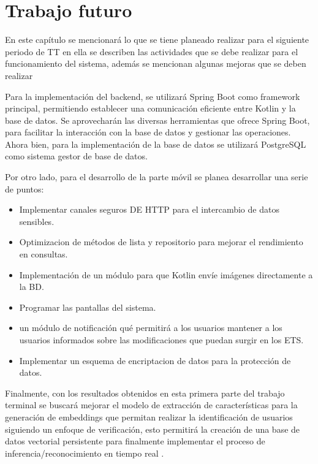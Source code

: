 
\chapter{Trabajo futuro}

En este capítulo se mencionará lo que se tiene planeado realizar para el siguiente periodo de TT en ella se describen las actividades que se debe realizar para el funcionamiento del sistema, además se mencionan algunas mejoras que se deben realizar

Para la implementación del backend, se utilizará Spring Boot como framework principal, permitiendo establecer una comunicación eficiente entre Kotlin y la base de datos. Se aprovecharán las diversas herramientas que ofrece Spring Boot, para facilitar la interacción con la base de datos y gestionar las operaciones. 
Ahora bien, para la implementación de la base de datos se utilizará PostgreSQL como sistema gestor de base de datos.

Por otro lado, para el desarrollo de la parte móvil se planea desarrollar una serie de puntos:
\begin{itemize}
    
    \item Implementar canales seguros DE HTTP para el intercambio de datos sensibles. 
    \item Optimizacion de métodos de lista y repositorio para mejorar el rendimiento en consultas. 
    \item Implementación de un módulo para que Kotlin envíe imágenes directamente a la BD. 
    \item Programar las pantallas del sistema. 
    \item un módulo de notificación qué permitirá a los usuarios mantener a los usuarios informados sobre las modificaciones que puedan surgir en los ETS. 
    \item Implementar un esquema de encriptacion de datos para la protección de datos.
\end{itemize}

Finalmente, con los resultados obtenidos en esta primera parte del trabajo terminal se buscará mejorar el modelo de extracción de características para la generación de embeddings que permitan realizar la identificación de usuarios siguiendo un enfoque de verificación, esto permitirá la creación de una base de datos vectorial persistente para finalmente implementar el proceso de inferencia/reconocimiento en tiempo real .